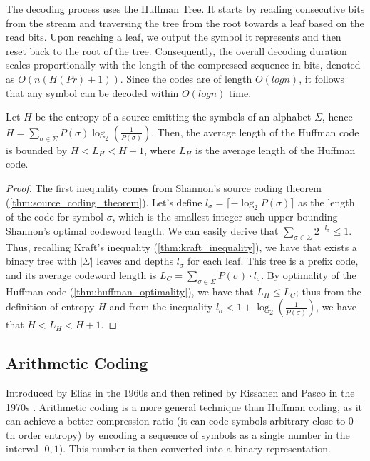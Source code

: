 The decoding process uses the Huffman Tree. It starts by reading consecutive bits from the stream and traversing the tree from the root towards a leaf based on the read bits. Upon reaching a leaf, we output the symbol it represents and then reset back to the root of the tree. Consequently, the overall decoding duration scales proportionally with the length of the compressed sequence in bits, denoted as $O(n(H(Pr) + 1))$. Since the codes are of length $O(log n)$, it follows that any symbol can be decoded within $O(log n)$ time.

\begin{theorem}
    Let $H$ be the entropy of a source emitting the symbols of an alphabet $\Sigma$, hence $H = \sum_{\sigma \in \Sigma} P(\sigma)\log_2\left(\frac{1}{P(\sigma)}\right)$. Then, the average length of the Huffman code is bounded by $H < L_H < H + 1$, where $L_H$ is the average length of the Huffman code.
\end{theorem}
\begin{proof}
    The first inequality comes from Shannon's source coding theorem (\autoref{thm:source_coding_theorem}). Let's define $l_\sigma = \lceil -\log_2 P(\sigma) \rceil$ as the length of the code for symbol $\sigma$, which is the smallest integer such upper bounding Shannon's optimal codeword length. We can easily derive that $\sum_{\sigma \in \Sigma} 2^{-l_\sigma} \leq 1$. Thus, recalling Kraft's inequality (\autoref{thm:kraft_inequality}), we have that exists a binary tree with $|\Sigma|$ leaves and depths $l_\sigma$ for each leaf. This tree is a prefix code, and its average codeword length is $L_C = \sum_{\sigma \in \Sigma} P(\sigma) \cdot l_\sigma$. By optimality of the Huffman code (\ref{thm:huffman_optimality}), we have that $L_H \leq L_C$; thus from the definition of entropy $H$ and from the inequality $l_\sigma < 1 + \log_2\left(\frac{1}{P(\sigma)}\right)$, we have that $H < L_H < H + 1$.
\end{proof}


\subsection{Arithmetic Coding}

Introduced by Elias in the 1960s and then refined by Rissanen and Pasco in the 1970s \cite{pasco1976source}. Arithmetic coding is a more general technique than Huffman coding, as it can achieve a better compression ratio (it can code symbols arbitrary close to 0-th order entropy) by encoding a sequence of symbols as a single number in the interval $[0,1)$. This number is then converted into a binary representation.

